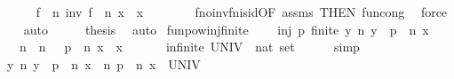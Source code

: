 \begin{isabellebody}
\ \ \ \ \isamarkupfalse%
\ {\isachardoublequoteopen}{\isacharparenleft}{\kern0pt}f\ {\isacharcircum}{\kern0pt}{\isacharcircum}{\kern0pt}\ n{\isacharparenright}{\kern0pt}\ {\isacharparenleft}{\kern0pt}{\isacharparenleft}{\kern0pt}inv\ f\ {\isacharcircum}{\kern0pt}{\isacharcircum}{\kern0pt}\ n{\isacharparenright}{\kern0pt}\ x{\isacharparenright}{\kern0pt}\ {\isacharequal}{\kern0pt}\ x{\isachardoublequoteclose}\isanewline
\ \ \ \ \ \ \isamarkupfalse%
\ fn{\isacharunderscore}{\kern0pt}o{\isacharunderscore}{\kern0pt}inv{\isacharunderscore}{\kern0pt}fn{\isacharunderscore}{\kern0pt}is{\isacharunderscore}{\kern0pt}id{\isacharbrackleft}{\kern0pt}OF\ assms{\isacharcomma}{\kern0pt}\ THEN\ fun{\isacharunderscore}{\kern0pt}cong{\isacharbrackright}{\kern0pt}\ \isamarkupfalse%
\ force\isanewline
\ \ \isamarkupfalse%
\ auto\isanewline
\ \ \isamarkupfalse%
\ \isamarkupfalse%
\ {\isacharquery}{\kern0pt}thesis\ \isamarkupfalse%
\ auto\isanewline
{}\isamarkupfalse%
%
\endisatagproof
{\isafoldproof}%
%
\isadelimproof
\isanewline
%
\endisadelimproof
\isanewline
{}\isamarkupfalse%
\ funpow{\isacharunderscore}{\kern0pt}inj{\isacharunderscore}{\kern0pt}finite{\isacharcolon}{\kern0pt}\ \isanewline
\ \ \ {\isacartoucheopen}inj\ p{\isacartoucheclose}\ {\isacartoucheopen}finite\ {\isacharbraceleft}{\kern0pt}y{\isachardot}{\kern0pt}\ {\isasymexists}n{\isachardot}{\kern0pt}\ y\ {\isacharequal}{\kern0pt}\ {\isacharparenleft}{\kern0pt}p\ {\isacharcircum}{\kern0pt}{\isacharcircum}{\kern0pt}\ n{\isacharparenright}{\kern0pt}\ x{\isacharbraceright}{\kern0pt}{\isacartoucheclose}\isanewline
\ \ \ n\ \ {\isacartoucheopen}n\ {\isachargreater}{\kern0pt}\ {}{\isacartoucheclose}\ {\isacartoucheopen}{\isacharparenleft}{\kern0pt}p\ {\isacharcircum}{\kern0pt}{\isacharcircum}{\kern0pt}\ n{\isacharparenright}{\kern0pt}\ x\ {\isacharequal}{\kern0pt}\ x{\isacartoucheclose}\ \isanewline
%
\isadelimproof
%
\endisadelimproof
%
\isatagproof
{}\isamarkupfalse%
\ {\isacharminus}{\kern0pt}\isanewline
\ \ \isamarkupfalse%
\ {\isacartoucheopen}infinite\ {\isacharparenleft}{\kern0pt}UNIV\ {\isacharcolon}{\kern0pt}{\isacharcolon}{\kern0pt}\ nat\ set{\isacharparenright}{\kern0pt}{\isacartoucheclose}\isanewline
\ \ \ \ \isamarkupfalse%
\ simp\isanewline
\ \ \isamarkupfalse%
\ \isamarkupfalse%
\ {\isacartoucheopen}{\isacharbraceleft}{\kern0pt}y{\isachardot}{\kern0pt}\ {\isasymexists}n{\isachardot}{\kern0pt}\ y\ {\isacharequal}{\kern0pt}\ {\isacharparenleft}{\kern0pt}p\ {\isacharcircum}{\kern0pt}{\isacharcircum}{\kern0pt}\ n{\isacharparenright}{\kern0pt}\ x{\isacharbraceright}{\kern0pt}\ {\isacharequal}{\kern0pt}\ {\isacharparenleft}{\kern0pt}{\isasymlambda}n{\isachardot}{\kern0pt}\ {\isacharparenleft}{\kern0pt}p\ {\isacharcircum}{\kern0pt}{\isacharcircum}{\kern0pt}\ n{\isacharparenright}{\kern0pt}\ x{\isacharparenright}{\kern0pt}\ {\isacharbackquote}{\kern0pt}\ UNIV{\isacartoucheclose}\isanewline

\end{isabellebody}
